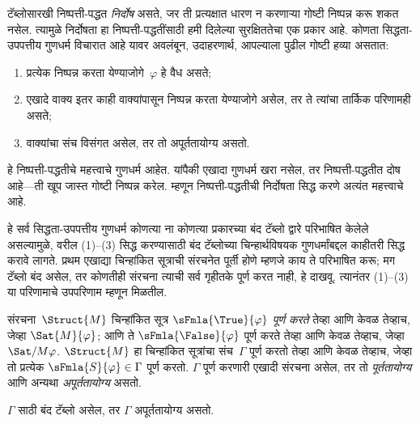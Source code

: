 \begin{explain}
टॅब्लोसारखी निष्पत्ती-पद्धत \emph{निर्दोष} असते, जर ती प्रत्यक्षात
धारण न करणाऱ्या गोष्टी निष्पन्न करू शकत नसेल. त्यामुळे निर्दोषता हा
निष्पत्ती-पद्धतींसाठी हमी दिलेल्या सुरक्षिततेचा एक प्रकार आहे. कोणता
सिद्धता-उपपत्तीय गुणधर्म विचारात आहे यावर अवलंबून, उदाहरणार्थ, आपल्याला
पुढील गोष्टी हव्या असतात:
\begin{enumerate}
\item प्रत्येक निष्पन्न करता येण्याजोगे~$\varphi$ हे वैध असते;
\item एखादे वाक्य इतर काही वाक्यांपासून निष्पन्न करता येण्याजोगे असेल, तर ते
  त्यांचा तार्किक परिणामही असते;
\item वाक्यांचा संच विसंगत असेल, तर तो अपूर्ततायोग्य असतो.
\end{enumerate}
हे निष्पत्ती-पद्धतीचे महत्त्वाचे गुणधर्म आहेत. यांपैकी एखादा गुणधर्म
खरा नसेल, तर निष्पत्ती-पद्धतीत दोष आहे---ती खूप जास्त गोष्टी
निष्पन्न करेल. म्हणून निष्पत्ती-पद्धतीची निर्दोषता सिद्ध करणे अत्यंत
महत्त्वाचे आहे.

हे सर्व सिद्धता-उपपत्तीय गुणधर्म कोणत्या ना कोणत्या प्रकारच्या बंद
टॅब्लो द्वारे परिभाषित केलेले असल्यामुळे, वरील (1)--(3) सिद्ध करण्यासाठी
बंद टॅब्लोच्या चिन्हार्थविषयक गुणधर्मांबद्दल काहीतरी सिद्ध करावे लागते.
प्रथम एखाद्या चिन्हांकित सूत्राची संरचनेत पूर्ती होणे म्हणजे काय ते
परिभाषित करू; मग टॅब्लो बंद असेल, तर कोणतीही संरचना त्याची सर्व गृहीतके
पूर्ण करत नाही, हे दाखवू. त्यानंतर (1)--(3) या परिणामाचे उपपरिणाम म्हणून
मिळतील.
\end{explain}

\begin{defn}
संरचना~$\Struct{M}$
चिन्हांकित सूत्र $\sFmla{\True}{\varphi}$ \emph{पूर्ण करते} तेव्हा आणि केवळ तेव्हाच, जेव्हा
$\Sat{M}{\varphi}$; आणि ते
$\sFmla{\False}{\varphi}$ पूर्ण करते तेव्हा आणि केवळ तेव्हाच, जेव्हा
$\Sat/{M}{\varphi}$. $\Struct{M}$
हा चिन्हांकित सूत्रांचा संच~$\Gamma$ पूर्ण करतो तेव्हा आणि केवळ तेव्हाच,
जेव्हा तो प्रत्येक $\sFmla{S}{\varphi} \in \Gamma$ पूर्ण करतो. $\Gamma$ पूर्ण
करणारी एखादी संरचना असेल, तर तो
\emph{पूर्ततायोग्य} आणि अन्यथा \emph{अपूर्ततायोग्य} असतो.
\end{defn}

\begin{thm}[निर्दोषता]
  \label{fol:tab:sou:thm:tableau-soundness}
  $\Gamma$ साठी बंद टॅब्लो असेल, तर $\Gamma$ अपूर्ततायोग्य असतो.
\end{thm}

